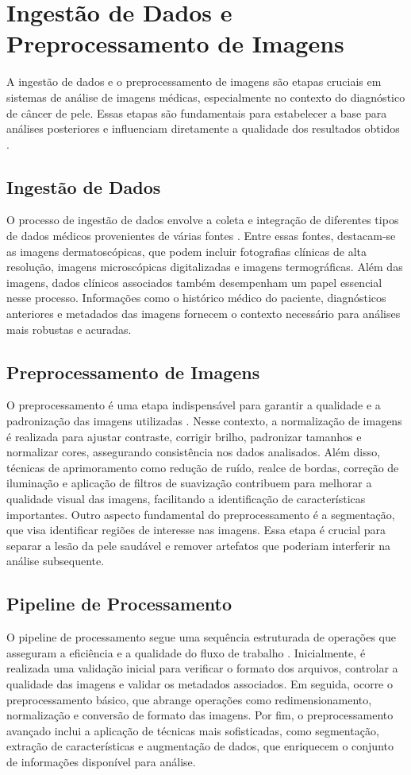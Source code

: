\section{Ingestão de Dados e Preprocessamento de Imagens}
A ingestão de dados e o preprocessamento de imagens são etapas cruciais em sistemas de análise de imagens médicas, especialmente no contexto do diagnóstico de câncer de pele. Essas etapas são fundamentais para estabelecer a base para análises posteriores e influenciam diretamente a qualidade dos resultados obtidos \cite{garcia2023medical}.
\subsection{Ingestão de Dados}
O processo de ingestão de dados envolve a coleta e integração de diferentes tipos de dados médicos provenientes de várias fontes \cite{kumar2023data}. Entre essas fontes, destacam-se as imagens dermatoscópicas, que podem incluir fotografias clínicas de alta resolução, imagens microscópicas digitalizadas e imagens termográficas. Além das imagens, dados clínicos associados também desempenham um papel essencial nesse processo. Informações como o histórico médico do paciente, diagnósticos anteriores e metadados das imagens fornecem o contexto necessário para análises mais robustas e acuradas.
\subsection{Preprocessamento de Imagens}
O preprocessamento é uma etapa indispensável para garantir a qualidade e a padronização das imagens utilizadas \cite{smith2023image}. Nesse contexto, a normalização de imagens é realizada para ajustar contraste, corrigir brilho, padronizar tamanhos e normalizar cores, assegurando consistência nos dados analisados. Além disso, técnicas de aprimoramento como redução de ruído, realce de bordas, correção de iluminação e aplicação de filtros de suavização contribuem para melhorar a qualidade visual das imagens, facilitando a identificação de características importantes.
Outro aspecto fundamental do preprocessamento é a segmentação, que visa identificar regiões de interesse nas imagens. Essa etapa é crucial para separar a lesão da pele saudável e remover artefatos que poderiam interferir na análise subsequente.
\subsection{Pipeline de Processamento}
O pipeline de processamento segue uma sequência estruturada de operações que asseguram a eficiência e a qualidade do fluxo de trabalho \cite{wang2023automated}. Inicialmente, é realizada uma validação inicial para verificar o formato dos arquivos, controlar a qualidade das imagens e validar os metadados associados. Em seguida, ocorre o preprocessamento básico, que abrange operações como redimensionamento, normalização e conversão de formato das imagens. Por fim, o preprocessamento avançado inclui a aplicação de técnicas mais sofisticadas, como segmentação, extração de características e augmentação de dados, que enriquecem o conjunto de informações disponível para análise.
